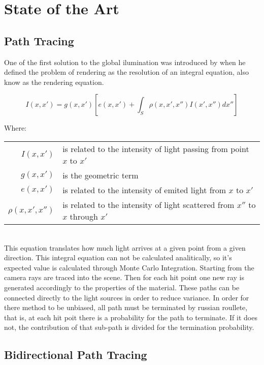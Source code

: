 \chapter{State of the Art}

\section{Path Tracing}

One of the first solution to the global ilumination was introduced by \cite{Kajiya} when he defined the problem of rendering as the resolution of an integral equation, also know as the rendering equation.

\begin{equation}
I(x,x')=g(x,x')\left[e(x,x')+\int_{S}^{} \rho(x,x',x'')I(x',x'')dx''\right]
\label{eq:render_eq}
\end{equation}

Where:

\begin{tabular}{r l}
$I(x,x')$ & is related to the intensity of light passing from point $x$ to $x'$ \\
$g(x,x')$ & is the geometric term \\
$e(x,x')$ & is related to the intensity of emited light from $x$ to $x'$ \\
$\rho(x,x',x'')$ & is related to the intensity of light scattered from $x''$ to $x$ through $x'$\\
\end{tabular}
\\

This equation translates how much light arrives at a given point from a given direction. This integral equation can not be calculated analitically, so it's expected value is calculated through Monte Carlo Integration. Starting from the camera rays are traced into the scene. Then for each hit point one new ray is generated accordingly to the properties of the material. These paths can be connected directly to the light sources in order to reduce variance. In order for there method to be unbiased, all path must be terminated by russian roullete, that is, at each hit poit there is a probability for the path to terminate. If it does not, the contribution of that sub-path is divided for the termination probability.


\section{Bidirectional Path Tracing}






